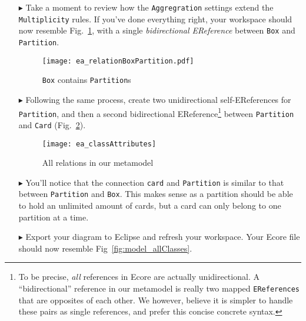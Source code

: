 \begin{itemize}
\item[$\blacktriangleright$] Take a moment to review how the \texttt{Aggregration} settings extend the \texttt{Multiplicity} rules. If you've done everything
right, your workspace should now resemble Fig.~\ref{fig:ereference_completed}, with a single \emph{bidirectional EReference} between \texttt{Box} and
\texttt{Partition}.

\vspace{1cm}

\begin{figure}[htbp]
	\centering
  \texttt{[image: ea\_relationBoxPartition.pdf]}
	\caption{\texttt{Box} contains \texttt{Partition}s}
	\label{fig:ereference_completed}
\end{figure}
\FloatBarrier

\item[$\blacktriangleright$] Following the same process, create two unidirectional self-EReferences for \texttt{Partition}, and then a second bidirectional
EReference\footnote{To be precise, \emph{all} references in Ecore are actually unidirectional. A ``bidirectional'' reference in our metamodel is really two
mapped \texttt{EReferences} that are opposites of each other. We however, believe it is simpler to handle these pairs as single references, and prefer this
concise concrete syntax.} between \texttt{Partition} and \texttt{Card} (Fig.~\ref{fig:ereferences_all}). 

\vspace{1cm}

\begin{figure}[htbp]
	\centering
  \texttt{[image: ea\_classAttributes]}
	\caption{All relations in our metamodel}
	\label{fig:ereferences_all}
\end{figure}
\FloatBarrier

\vspace{1cm}

\item[$\blacktriangleright$] You'll notice that the connection \texttt{card} and \texttt{Partition} is similar to that between \texttt{Partition} and
\texttt{Box}. This makes sense as a partition should be able to hold an unlimited amount of cards, but a card can only belong to one partition at a time.

\vspace{1cm}

\item[$\blacktriangleright$] Export your diagram to Eclipse and refresh your workspace. Your Ecore file should now resemble Fig~\ref{fig:model_allClasses}.


\end{itemize}
